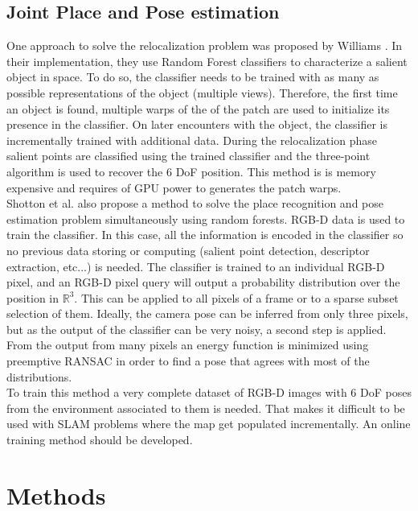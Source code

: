 \subsection{Joint Place and Pose estimation}
\label{ssub:joint_place_and_pose_estimaton}

One approach to solve the relocalization problem was proposed by Williams \cite{Williams2007}. In their implementation, they use Random Forest classifiers to characterize a salient object in space. To do so, the classifier needs to be trained with as many as possible representations of the object (multiple views). Therefore, the first time an object is found, multiple warps of the of the patch are used to initialize its presence in the classifier. On later encounters with the object, the classifier is incrementally trained with additional data. During the relocalization phase salient points are classified using the trained classifier and the three-point algorithm is used to recover the 6 DoF position. This method is is memory expensive and requires of GPU power to generates the patch warps.\\

Shotton et al. \cite{Shotton2013} also propose a method to solve the place recognition and pose estimation problem simultaneously using random forests. RGB-D data is used to train the classifier. In this case, all the information is encoded in the classifier so no previous data storing or computing (salient point detection, descriptor extraction, etc...) is needed. The classifier is trained to an individual RGB-D pixel, and an RGB-D pixel query will output a probability distribution over the position in $\mathbb{R}^3$. This can be applied to all pixels of a frame or to a sparse subset selection of them. Ideally, the camera pose can be inferred from only three pixels, but as the output of the classifier can be very noisy, a second step is applied. From the output from many pixels an energy function is minimized using preemptive RANSAC in order to find a pose that agrees with most of the distributions.\\

To train this method a very complete dataset of RGB-D images with 6 DoF poses from the environment associated to them is needed. That makes it difficult to be used with SLAM problems where the map get populated incrementally. An online training  method should be developed.\\


\section{Methods}
\label{sec:methods}



